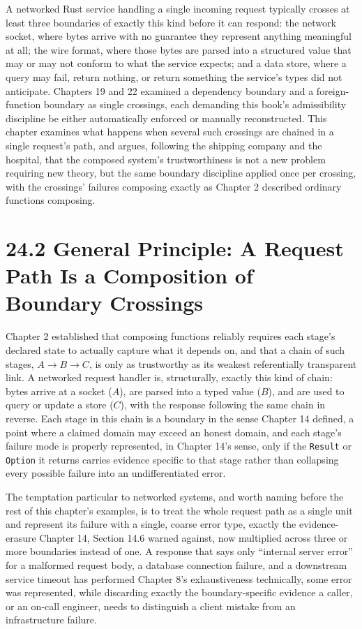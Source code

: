 \documentclass[11pt]{book}
\begin{document}
A networked Rust service handling a single incoming request typically crosses at least three boundaries of exactly this kind before it can respond: the network socket, where bytes arrive with no guarantee they represent anything meaningful at all; the wire format, where those bytes are parsed into a structured value that may or may not conform to what the service expects; and a data store, where a query may fail, return nothing, or return something the service's types did not anticipate. Chapters 19 and 22 examined a dependency boundary and a foreign-function boundary as single crossings, each demanding this book's admissibility discipline be either automatically enforced or manually reconstructed. This chapter examines what happens when several such crossings are chained in a single request's path, and argues, following the shipping company and the hospital, that the composed system's trustworthiness is not a new problem requiring new theory, but the same boundary discipline applied once per crossing, with the crossings' failures composing exactly as Chapter 2 described ordinary functions composing.

\section*{24.2 General Principle: A Request Path Is a Composition of Boundary Crossings}

Chapter 2 established that composing functions reliably requires each stage's declared state to actually capture what it depends on, and that a chain of such stages, $A \to B \to C$, is only as trustworthy as its weakest referentially transparent link. A networked request handler is, structurally, exactly this kind of chain: bytes arrive at a socket ($A$), are parsed into a typed value ($B$), and are used to query or update a store ($C$), with the response following the same chain in reverse. Each stage in this chain is a boundary in the sense Chapter 14 defined, a point where a claimed domain may exceed an honest domain, and each stage's failure mode is properly represented, in Chapter 14's sense, only if the \texttt{Result} or \texttt{Option} it returns carries evidence specific to that stage rather than collapsing every possible failure into an undifferentiated error.

The temptation particular to networked systems, and worth naming before the rest of this chapter's examples, is to treat the whole request path as a single unit and represent its failure with a single, coarse error type, exactly the evidence-erasure Chapter 14, Section 14.6 warned against, now multiplied across three or more boundaries instead of one. A response that says only ``internal server error'' for a malformed request body, a database connection failure, and a downstream service timeout has performed Chapter 8's exhaustiveness technically, some error was represented, while discarding exactly the boundary-specific evidence a caller, or an on-call engineer, needs to distinguish a client mistake from an infrastructure failure.
\end{document}
